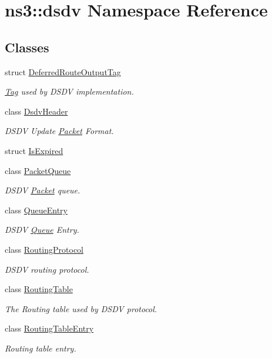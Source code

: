 \hypertarget{namespacens3_1_1dsdv}{}\section{ns3\+:\+:dsdv Namespace Reference}
\label{namespacens3_1_1dsdv}
\subsection*{Classes}
\begin{DoxyCompactItemize}
\item 
struct \hyperlink{structns3_1_1dsdv_1_1DeferredRouteOutputTag}{Deferred\+Route\+Output\+Tag}
\begin{DoxyCompactList}\small\item\em \hyperlink{classns3_1_1Tag}{Tag} used by D\+S\+DV implementation. \end{DoxyCompactList}\item 
class \hyperlink{classns3_1_1dsdv_1_1DsdvHeader}{Dsdv\+Header}
\begin{DoxyCompactList}\small\item\em D\+S\+DV Update \hyperlink{classns3_1_1Packet}{Packet} Format. \end{DoxyCompactList}\item 
struct \hyperlink{structns3_1_1dsdv_1_1IsExpired}{Is\+Expired}
\item 
class \hyperlink{classns3_1_1dsdv_1_1PacketQueue}{Packet\+Queue}
\begin{DoxyCompactList}\small\item\em D\+S\+DV \hyperlink{classns3_1_1Packet}{Packet} queue. \end{DoxyCompactList}\item 
class \hyperlink{classns3_1_1dsdv_1_1QueueEntry}{Queue\+Entry}
\begin{DoxyCompactList}\small\item\em D\+S\+DV \hyperlink{classns3_1_1Queue}{Queue} Entry. \end{DoxyCompactList}\item 
class \hyperlink{classns3_1_1dsdv_1_1RoutingProtocol}{Routing\+Protocol}
\begin{DoxyCompactList}\small\item\em D\+S\+DV routing protocol. \end{DoxyCompactList}\item 
class \hyperlink{classns3_1_1dsdv_1_1RoutingTable}{Routing\+Table}
\begin{DoxyCompactList}\small\item\em The Routing table used by D\+S\+DV protocol. \end{DoxyCompactList}\item 
class \hyperlink{classns3_1_1dsdv_1_1RoutingTableEntry}{Routing\+Table\+Entry}
\begin{DoxyCompactList}\small\item\em Routing table entry. \end{DoxyCompactList}\end{DoxyCompactItemize}
